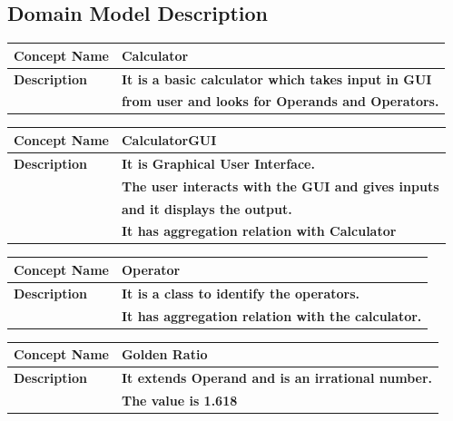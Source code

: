 \documentclass[12pt]{extarticle}
\begin{document}
\newpage
\subsection{Domain Model Description}

\begin{table}[h]
\centering
\begin{tabular}{|l|l|}
\hline
\textbf{Concept Name} & \textbf{Calculator} \\
\hline

\textbf{Description} & \textbf{It is a basic calculator which takes input in GUI }\\
& \textbf{from user and looks for Operands and Operators.} \\
\hline
\end{tabular}
\end{table}


\begin{table}[h]
\centering
\begin{tabular}{|l|l|}
\hline
\textbf{Concept Name} & \textbf{CalculatorGUI} \\

\hline
\textbf{Description} & \textbf{It is Graphical User Interface.}\\ & \textbf{The user interacts with the GUI and gives inputs}\\
& \textbf{and it displays the output.}\\ & \textbf{It has aggregation relation with Calculator}\\
\hline
\end{tabular}
\end{table}


\begin{table}[h]
\centering
\begin{tabular}{|l|l|}
\hline
\textbf{Concept Name} & \textbf{Operator} \\
\hline
\textbf{Description} & \textbf{It is a class to identify the operators.}\\
& \textbf{It has aggregation relation with the calculator.} \\
\hline
\end{tabular}
\end{table}


\begin{table}[h]
\centering
\begin{tabular}{|l|l|}
\hline
\textbf{Concept Name} & \textbf{Golden Ratio} \\
\hline

\textbf{Description} & \textbf{It extends Operand and is an irrational number.}\\
& \textbf{The value is 1.618} 
\\
\hline
\end{tabular}
\end{table}
\newpage
\end{document}
